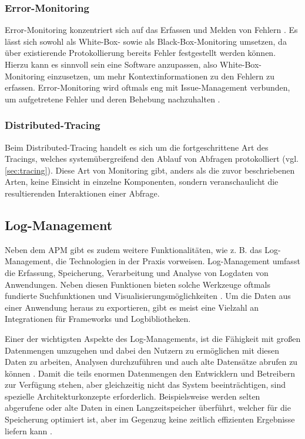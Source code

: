 \subsubsection{Error-Monitoring}

Error-Monitoring konzentriert sich auf das Erfassen und Melden von Fehlern \cite{CrashbinCrashMonitoring}. Es lässt sich sowohl als White-Box- sowie als Black-Box-Monitoring umsetzen, da über existierende Protokollierung bereits Fehler festgestellt werden können. Hierzu kann es sinnvoll sein eine Software anzupassen, also White-Box-Monitoring einzusetzen, um mehr Kontextinformationen zu den Fehlern zu erfassen. Error-Monitoring wird oftmals eng mit Issue-Management verbunden, um aufgetretene Fehler und deren Behebung nachzuhalten \cite{CrashbinCrashMonitoring}.

\subsubsection{Distributed-Tracing}

Beim Distributed-Tracing handelt es sich um die fortgeschrittene Art des Tracings, welches systemübergreifend den Ablauf von Abfragen protokolliert (vgl. \autoref{sec:tracing}). Diese Art von Monitoring gibt, anders als die zuvor beschriebenen Arten, keine Einsicht in einzelne Komponenten, sondern veranschaulicht die resultierenden Interaktionen einer Abfrage.

\subsection{Log-Management}

Neben dem APM gibt es zudem weitere Funktionalitäten, wie z. B. das Log-Management, die Technologien in der Praxis vorweisen. Log-Management umfasst die Erfassung, Speicherung, Verarbeitung und Analyse von Logdaten von Anwendungen. Neben diesen Funktionen bieten solche Werkzeuge oftmals fundierte Suchfunktionen und Visualisierungsmöglichkeiten \cite{DesignLogManagementSystem}. Um die Daten aus einer Anwendung heraus zu exportieren, gibt es meist eine Vielzahl an Integrationen für Frameworks und Logbibliotheken.

Einer der wichtigsten Aspekte des Log-Managements, ist die Fähigkeit mit großen Datenmengen umzugehen und dabei den Nutzern zu ermöglichen mit diesen Daten zu arbeiten, Analysen durchzuführen und auch alte Datensätze abrufen zu können \cite{LoggingAndLogManagement}. Damit die teils enormen Datenmengen den Entwicklern und Betreibern zur Verfügung stehen, aber gleichzeitig nicht das System beeinträchtigen, sind spezielle Architekturkonzepte erforderlich. Beispielsweise werden selten abgerufene oder alte Daten in einen Langzeitspeicher überführt, welcher für die Speicherung optimiert ist, aber im Gegenzug keine zeitlich effizienten Ergebnisse liefern kann \cite{LoggingAndLogManagement}.

